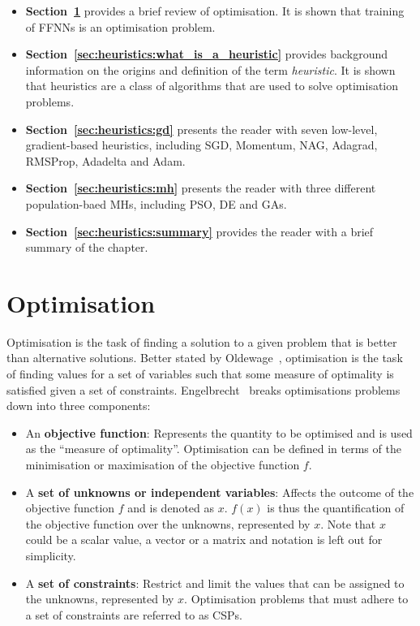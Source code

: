 \begin{itemize}
      \item \textbf{Section~\ref{sec:heuristics:optimisation}} provides a brief review of optimisation. It is shown that training of \acp{FFNN} is an optimisation problem.

      \item \textbf{Section~\ref{sec:heuristics:what_is_a_heuristic}} provides background information on the origins and definition of the term \textit{heuristic}. It is shown that heuristics are a class of algorithms that are used to solve optimisation problems.

      \item \textbf{Section~\ref{sec:heuristics:gd}} presents the reader with seven low-level, gradient-based heuristics, including \acf{SGD}, \acf{Momentum}, \acf{NAG}, \acf{Adagrad}, \acf{RMSProp}, \acf{Adadelta} and \acf{Adam}.

      \item \textbf{Section~\ref{sec:heuristics:mh}} presents the reader with three different population-baed \acp{MH}, including \acf{PSO}, \acf{DE} and \acfp{GA}.

      \item \textbf{Section~\ref{sec:heuristics:summary}} provides the reader with a brief summary of the chapter.
\end{itemize}

\section{Optimisation}\label{sec:heuristics:optimisation}

Optimisation is the task of finding a solution to a given problem that is better than alternative solutions. Better stated by Oldewage~\cite{ref:oldewage:2017}, optimisation is the task of finding values for a set of variables such that some measure of optimality is satisfied given a set of constraints. Engelbrecht~\cite{ref:engelbrecht:2007} breaks optimisations problems down into three components:

\begin{itemize}
      \item An \textbf{objective function}: Represents the quantity to be optimised and is used as the ``measure of optimality''. Optimisation can be defined in terms of the minimisation or maximisation of the objective function $f$.

      \item A \textbf{set of unknowns or independent variables}: Affects the outcome of the objective function $f$ and is denoted as $x$. $f(x)$ is thus the quantification of the objective function over the unknowns, represented by $x$. Note that $x$ could be a scalar value, a vector or a matrix and notation is left out for simplicity.

      \item A \textbf{set of constraints}: Restrict and limit the values that can be assigned to the unknowns, represented by $x$. Optimisation problems that must adhere to a set of constraints are referred to as \acfp{CSP}.
\end{itemize}

